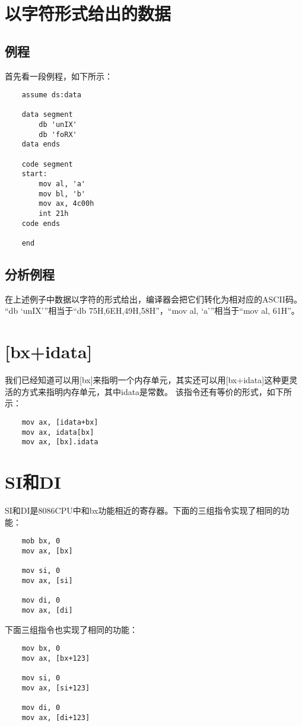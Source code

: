 \documentclass[a4paper,left=2.5cm,right=2.5cm,11pt]{article}
\begin{document}
\tableofcontents

\clearpage

\section{以字符形式给出的数据}
\subsection{例程}
	首先看一段例程，如下所示：
	\begin{lstlisting}
	assume ds:data

	data segment
		db 'unIX'
		db 'foRX'
	data ends

	code segment
	start:
		mov al, 'a'
		mov bl, 'b'
		mov ax, 4c00h
		int 21h
	code ends

	end
	\end{lstlisting}

\subsection{分析例程}
	在上述例子中数据以字符的形式给出，编译器会把它们转化为相对应的ASCII码。
	“db ‘unIX’”相当于“db 75H,6EH,49H,58H”，“mov al, ‘a’”相当于“mov al, 61H”。

\section{[bx+idata]}
	我们已经知道可以用[bx]来指明一个内存单元，其实还可以用[bx+idata]这种更灵活的方式来指明内存单元，其中idata是常数。
	该指令还有等价的形式，如下所示：
	\begin{lstlisting}
	mov ax, [idata+bx]
	mov ax, idata[bx]
	mov ax, [bx].idata
	\end{lstlisting}

\section{SI和DI}
	SI和DI是8086CPU中和bx功能相近的寄存器。下面的三组指令实现了相同的功能：
	\begin{lstlisting}
	mob bx, 0
	mov ax, [bx]

	mov si, 0
	mov ax, [si]

	mov di, 0
	mov ax, [di]
	\end{lstlisting}

	下面三组指令也实现了相同的功能：
	\begin{lstlisting}
	mov bx, 0
	mov ax, [bx+123]

	mov si, 0
	mov ax, [si+123]

	mov di, 0
	mov ax, [di+123]
	\end{lstlisting}
\end{document}
